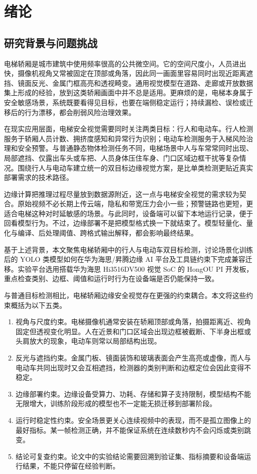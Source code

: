 \chapter{绪论}
\label{cha:introduction}

\section{研究背景与问题挑战}

电梯轿厢是城市建筑中使用频率很高的公共微空间。它的空间尺度小，人员进出快，摄像机视角又常被固定在顶部或角落，因此同一画面里容易同时出现近距离遮挡、镜面反光、金属门框高亮和透视畸变。通用视觉模型在道路、走廊或开放数据集上形成的经验，放到这类轿厢画面中并不总是适用。更麻烦的是，电梯本身属于安全敏感场景，系统既要看得见目标，也要在端侧稳定运行；持续漏检、误检或迁移后的行为漂移，都会削弱风险治理效果。

在现实应用层面，电梯安全视觉需要同时关注两类目标：行人和电动车。行人检测服务于轿厢人员计数、拥挤度感知和异常行为识别；电动车检测服务于入梯风险治理和安全预警。与普通静态物体检测任务不同，电梯场景中人与车常常同时出现、局部遮挡、仅露出车头或车把、人员身体压住车身、门口区域边框干扰等复杂情况。围绕行人与电动车建立统一的双目标边缘视觉方案，是比单类检测更贴近真实部署需求的技术路径。

边缘计算把推理过程尽量放到数据源附近，这一点与电梯安全视觉的需求较为契合\cite{shi2016edge}。原始视频不必长期上传云端，隐私和带宽压力会小一些；预警链路也更短，更适合电梯这种对时延敏感的场景。与此同时，设备端可以留下本地运行记录，便于回看模型行为。不过，边缘部署不是把模型格式换一下就结束了。模型轻量化、量化与编译、后处理阈值、跨格式输出解释，都会影响最终结果。

基于上述背景，本文聚焦电梯轿厢中的行人与电动车双目标检测，讨论场景化训练后的 YOLO 类模型如何在华为海思/昇腾边缘 AI 平台及工具链约束下完成兼容迁移。实验平台选用搭载华为海思 Hi3516DV500 视觉 SoC 的 HongOU PI 开发板，重点检查类别、边框、阈值和运行时行为在设备端是否仍能保持一致。


与普通目标检测相比，电梯轿厢边缘安全视觉存在更强的约束耦合。本文将这些约束概括为以下五类。

\begin{enumerate}
    \item 视角与尺度约束。电梯摄像机通常安装在轿厢顶部或角落，拍摄距离近、视角固定但透视变化明显。人在近景和门口区域会出现边框被截断、下半身出框或头肩放大的现象，电动车则常以局部结构出现。
    \item 反光与遮挡约束。金属门板、镜面装饰和玻璃表面会产生高亮或虚像，而人与电动车共同出现时又会互相遮挡，检测器的类别判断和边框定位会因此变得不稳定。
    \item 边缘部署约束。边缘设备受算力、功耗、存储和算子支持限制，模型结构不能无限增大，训练阶段形成的模型也不一定能无损迁移到部署阶段。
    \item 运行时稳定性约束。安全场景更关心连续视频中的表现，而不是孤立图像上的最好指标。某一帧检测正确，并不能保证系统在连续数秒内不会闪烁或类别跳变。
    \item 结论可复查约束。论文中的实验结论需要回溯到验证集、指标摘要和设备端运行结果，不能只停留在经验判断。
\end{enumerate}

